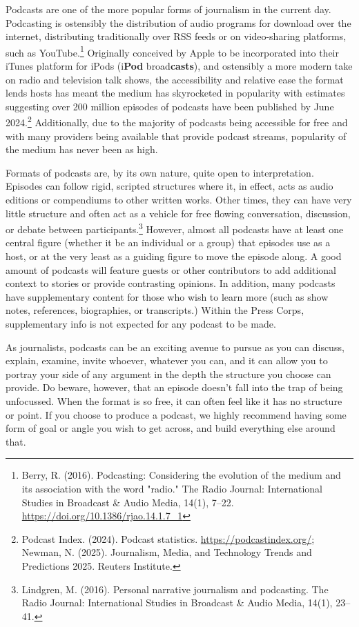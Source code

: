Podcasts are one of the more popular forms of journalism in the current day. Podcasting is ostensibly the distribution of audio programs for download over the internet, distributing traditionally over RSS feeds or on video-sharing platforms, such as YouTube.\footnote{Berry, R. (2016). Podcasting: Considering the evolution of the medium and its association with the word "radio." The Radio Journal: International Studies in Broadcast \& Audio Media, 14(1), 7–22. \url{https://doi.org/10.1386/rjao.14.1.7_1}} Originally conceived by Apple to be incorporated into their iTunes platform for iPods (i\textbf{Pod} broad\textbf{casts}), and ostensibly a more modern take on radio and television talk shows, the accessibility and relative ease the format lends hosts has meant the medium has skyrocketed in popularity with estimates suggesting over 200 million episodes of podcasts have been published by June 2024.\footnote{Podcast Index. (2024). Podcast statistics. \url{https://podcastindex.org/}; Newman, N. (2025). Journalism, Media, and Technology Trends and Predictions 2025. Reuters Institute.} Additionally, due to the majority of podcasts being accessible for free and with many providers being available that provide podcast streams, popularity of the medium has never been as high.

Formats of podcasts are, by its own nature, quite open to interpretation. Episodes can follow rigid, scripted structures where it, in effect, acts as audio editions or compendiums to other written works. Other times, they can have very little structure and often act as a vehicle for free flowing conversation, discussion, or debate between participants.\footnote{Lindgren, M. (2016). Personal narrative journalism and podcasting. The Radio Journal: International Studies in Broadcast \& Audio Media, 14(1), 23–41.} However, almost all podcasts have at least one central figure (whether it be an individual or a group) that episodes use as a host, or at the very least as a guiding figure to move the episode along. A good amount of podcasts will feature guests or other contributors to add additional context to stories or provide contrasting opinions. In addition, many podcasts have supplementary content for those who wish to learn more (such as show notes, references, biographies, or transcripts.) Within the Press Corps, supplementary info is not expected for any podcast to be made.

As journalists, podcasts can be an exciting avenue to pursue as you can discuss, explain, examine, invite whoever, whatever you can, and it can allow you to portray your side of any argument in the depth the structure you choose can provide. Do beware, however, that an episode doesn’t fall into the trap of being unfocussed. When the format is so free, it can often feel like it has no structure or point. If you choose to produce a podcast, we highly recommend having some form of goal or angle you wish to get across, and build everything else around that.


